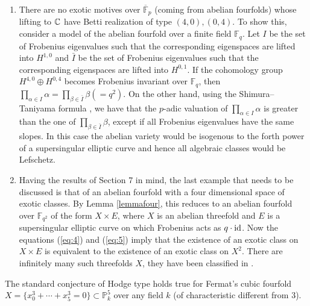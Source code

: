 \begin{remark}
\begin{enumerate}
As already pointed out, these examples are less interesting for the standard conjecture of Hodge type, see Remark \ref{boris}(\ref{duccio}).
\item\label{altreesotiche2} There are no exotic motives over $\overline{\mathbb{F}}_p$ (coming from abelian fourfolds) whose lifting  to $\mathbb{C}$ have Betti realization    of type $(4,0),(0,4)$. To show this, consider a model of the abelian fourfold over a finite field $\mathbb{F}_{q}$. Let $I$ be the set of Frobenius eigenvalues such that the corresponding eigenspaces are lifted into $H^{1,0}$ and $\bar{I}$ be the set of Frobenius eigenvalues such that the corresponding eigenspaces are lifted into $H^{0,1}$. If the cohomology group $H^{4,0}\oplus H^{0,4}$ becomes Frobenius invariant over $\mathbb{F}_q$, then $\prod_{\alpha\in I} \alpha = \prod_{\beta\in \bar{I}} \beta(=q^2).$ On the other hand, using the Shimura--Taniyama formula  \cite[Lemma 5]{TateBour}, we have that the $p$-adic valuation of  $\prod_{\alpha\in I} \alpha$ is greater than the one of $ \prod_{\beta\in \bar{I}} \beta$, except if all Frobenius eigenvalues have the same slopes. In this case the abelian variety would be isogenous to the forth power of a supersingular elliptic curve and hence all algebraic classes would be Lefschetz.
\item Having the results of Section 7 in mind, the last example  that needs to be discussed is that of an abelian fourfold with a four dimensional space of exotic classes. By Lemma \ref{lemmafour}, this reduces to an abelian fourfold over  $\mathbb{F}_{q^2}$  of the form $X\times E$, where $X$ is an abelian threefold and $E$ is a supersingular elliptic curve on which   Frobenius acts as $q \cdot \mathrm{id}$. Now the equations  (\ref{eq:4}) and  (\ref{eq:5}) imply that the existence of an exotic class on  $X\times E$ is equivalent to the existence of an exotic class on $X^2$. There are infinitely many such threefolds $X$, they have been classified in \cite{Zah}.
\end{enumerate}
\end{remark}
\begin{proposition}
\notready\label{propfermat}
The standard conjecture of Hodge type holds true for Fermat's cubic fourfold
$X=\{x_0^3+\cdots +x_5^3=0\}\subset \mathbb{P}_k^5$ over any field $k$ (of characteristic different from $3$).
\end{proposition}
